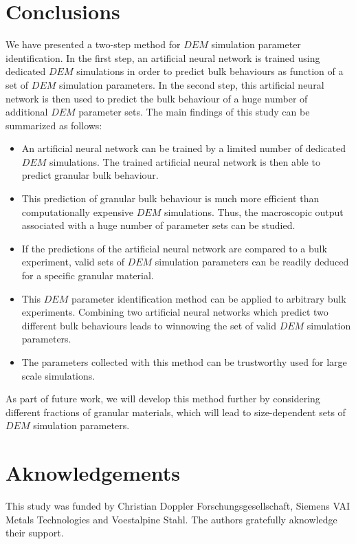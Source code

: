 \documentclass{CFD2015}
\begin{document}
\section{Conclusions}
\label{sec:conclusions}
We have presented a two-step method for $DEM$ simulation parameter
identification. In the first step, an artificial neural network is 
trained using dedicated $DEM$ simulations in order to predict bulk 
behaviours as function of a set of $DEM$ simulation parameters. 
In the second step, this artificial neural network is then used 
to predict the bulk behaviour of a huge number of additional $DEM$ parameter
sets.
The main findings of this study can be summarized as follows:
\begin{itemize}
  \item{An artificial neural network can be trained by a limited number of
  dedicated $DEM$ simulations.
  		The trained artificial neural network is then able to predict
  		granular bulk behaviour.}
  \item{This prediction of granular bulk behaviour is much more efficient
  		than computationally expensive $DEM$ simulations.
  		Thus, the macroscopic output associated with a huge number of parameter sets
  		can be studied.}
  \item{If the predictions of the artificial neural network are compared to a bulk experiment, 
  		valid sets of $DEM$ simulation parameters can be readily deduced for a
  		specific granular material.}
  \item{This $DEM$ parameter identification method can be applied to
  arbitrary bulk experiments.
  		Combining two artificial neural networks which predict two different bulk
  		behaviours leads to winnowing the set of valid $DEM$ simulation parameters.}
  \item{The parameters collected with this method can be trustworthy used for
  large scale simulations.}
\end{itemize}
As part of future work, we will develop this method further by considering
different fractions of granular materials, which will lead to size-dependent sets of $DEM$
simulation parameters.



\section{Aknowledgements}
This study was funded by Christian Doppler Forschungsgesellschaft, Siemens VAI Metals Technologies and Voestalpine Stahl. The authors gratefully aknowledge their support.\\


   
\end{document}
